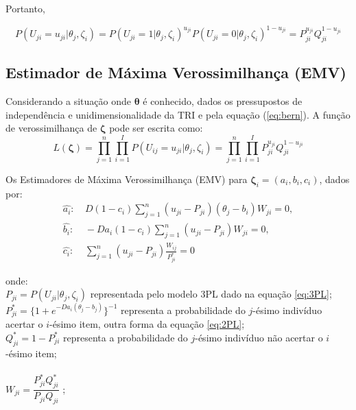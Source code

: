 Portanto,  

\begin{equation} \label{eq:bern}
P(U_{ji} = u_{ji}|\theta_j, \zeta_i) = P(U_{ji} = 1|\theta_j, \zeta_i)^{u_{ji}}
P(U_{ji} = 0|\theta_j, \zeta_i)^{1 - u_{ji}} = P_{ji}^{u_{ji}}Q_{ji}^{1-u_{ji}}
\end{equation}


\subsection{Estimador de Máxima Verossimilhança (EMV)}

Considerando a situação onde $ \boldsymbol{\theta} $ é conhecido, dados os pressupostos de independência e unidimensionalidade da TRI e pela equação (\ref{eq:bern}). A função de verossimilhança de  $ \boldsymbol{\zeta} $ pode ser escrita como:
\[
L(\boldsymbol{\zeta}) =  \prod_{j=1}^{n}\prod_{i=1}^{I}P(U_{ij} = u_{ji}|\theta_j, \zeta_i) = \prod_{j=1}^{n}\prod_{i=1}^{I}P_{ji}^{u_{ji}}Q_{ji}^{1-u_{ji}}
\]

Os Estimadores de Máxima Verossimilhança (EMV) para $ \boldsymbol{\zeta}_i = (a_i, b_i , c_i )$, dados por:\\


\[
\begin{aligned}
	\hat{a_i}: & \ D(1 - c_i)\sum_{j=1}^{n}(u_{ji} - P_{ji})(\theta_j - b_i)W_{ji} = 0, \\[1em]
	\hat{b_i}: & \ -Da_i(1 - c_i)\sum_{j=1}^{n}(u_{ji} - P_{ji})W_{ji} = 0, \\[1em]
	\hat{c_i}: & \ \sum_{j=1}^{n}(u_{ji} - P_{ji})\frac{W_{ij}}{P^*_{ji}} = 0
\end{aligned}
\]

\noindent onde:\\

\noindent $P_{ji} = P(U_{ji}|\theta_j,\zeta_i)$ representada pelo modelo 3PL dado na equação \ref{eq:3PL};\\

\noindent $P^*_{ji} = \{1 + e^{-Da_i(\theta_j - b_j)}\}^{-1} $ representa a probabilidade do $j$-ésimo indivíduo acertar o $i$-ésimo item, outra forma da equação \ref{eq:2PL};\\

\noindent $Q^*_{ji} = 1 - P^*_{ji} $ representa a probabilidade do $j$-ésimo indivíduo não acertar o $i$-ésimo item;\\
\\
\noindent $W_{ji} = \dfrac{P^*_{ji}Q^*_{ji}}{P_{ji}Q_{ji}} $ ;\\




